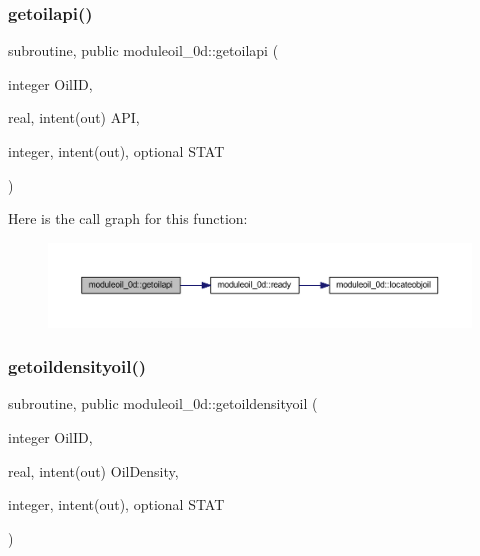\subsubsection{\texorpdfstring{getoilapi()}{getoilapi()}}
{\footnotesize\ttfamily subroutine, public moduleoil\+\_\+0d\+::getoilapi (\begin{DoxyParamCaption}\item[{integer}]{Oil\+ID,  }\item[{real, intent(out)}]{A\+PI,  }\item[{integer, intent(out), optional}]{S\+T\+AT }\end{DoxyParamCaption})}

Here is the call graph for this function\+:\nopagebreak
\begin{figure}[H]
\begin{center}
\leavevmode
\includegraphics[width=350pt]{namespacemoduleoil__0d_a69465813f24b303b64f2b23399c114da_cgraph}
\end{center}
\end{figure}
\mbox{\label{namespacemoduleoil__0d_ab2e737cc90063238a3eedf443bd6b593}} 
\subsubsection{\texorpdfstring{getoildensityoil()}{getoildensityoil()}}
{\footnotesize\ttfamily subroutine, public moduleoil\+\_\+0d\+::getoildensityoil (\begin{DoxyParamCaption}\item[{integer}]{Oil\+ID,  }\item[{real, intent(out)}]{Oil\+Density,  }\item[{integer, intent(out), optional}]{S\+T\+AT }\end{DoxyParamCaption})}

